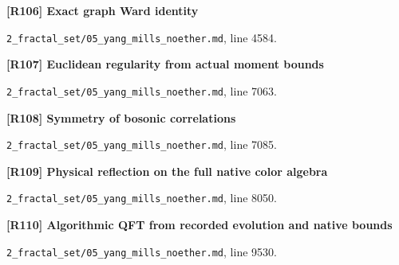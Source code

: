 \documentclass[11pt,a4paper]{article}
\begin{document}
\par\medskip\noindent\begin{minipage}{\linewidth}\textbf{[R106] Exact graph Ward identity}\label{src:lem-ym-discrete-ward}\par
{\small\texttt{}\par
\nolinkurl{2_fractal_set/05_yang_mills_noether.md}, line 4584.\par}
\end{minipage}\par

\par\medskip\noindent\begin{minipage}{\linewidth}\textbf{[R107] Euclidean regularity from actual moment bounds}\label{src:thm-os-os0-fg}\par
{\small\texttt{}\par
\nolinkurl{2_fractal_set/05_yang_mills_noether.md}, line 7063.\par}
\end{minipage}\par

\par\medskip\noindent\begin{minipage}{\linewidth}\textbf{[R108] Symmetry of bosonic correlations}\label{src:thm-os-os4-fg}\par
{\small\texttt{}\par
\nolinkurl{2_fractal_set/05_yang_mills_noether.md}, line 7085.\par}
\end{minipage}\par

\par\medskip\noindent\begin{minipage}{\linewidth}\textbf{[R109] Physical reflection on the full native color algebra}\label{src:prop-ym-native-color-reflected-matrices}\par
{\small\texttt{}\par
\nolinkurl{2_fractal_set/05_yang_mills_noether.md}, line 8050.\par}
\end{minipage}\par

\par\medskip\noindent\begin{minipage}{\linewidth}\textbf{[R110] Algorithmic QFT from recorded evolution and native bounds}\label{src:thm-ym-algorithmic-qft-synthesis}\par
{\small\texttt{}\par
\nolinkurl{2_fractal_set/05_yang_mills_noether.md}, line 9530.\par}
\end{minipage}\par
\end{document}
